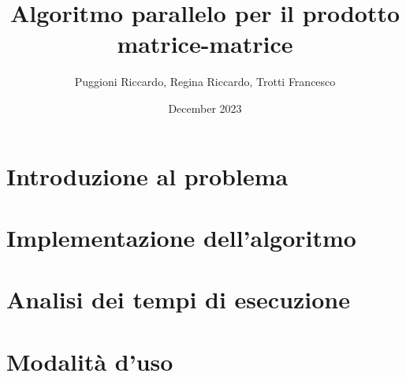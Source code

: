 \documentclass{article}
\title{Algoritmo parallelo per il prodotto matrice-matrice}
\author{Puggioni Riccardo, Regina Riccardo, Trotti Francesco }
\date{December 2023}
\begin{document}
\maketitle

\newpage
\tableofcontents

\newpage
\section{Introduzione al problema}
    

\section{Implementazione dell'algoritmo}
    

\section{Analisi dei tempi di esecuzione}
    

\section{Modalità d'uso}
    
\end{document}
